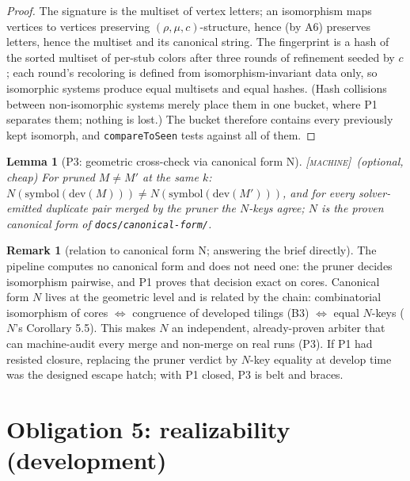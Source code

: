 \documentclass[11pt]{article}
\newtheorem{lemma}[theorem]{Lemma}
\theoremstyle{definition}
\newtheorem{remark}[theorem]{Remark}
\newcommand{\MACHINE}{\textnormal{\textsc{[machine]}}}
\newcommand{\dev}{\mathrm{dev}}
\begin{document}
\begin{proof}
The signature is the multiset of vertex letters; an isomorphism maps vertices to vertices
preserving $(\rho, \mu, c)$-structure, hence (by A6) preserves letters, hence the
multiset and its canonical string. The fingerprint is a hash of the sorted multiset of
per-stub colors after three rounds of refinement seeded by $c$; each round's recoloring
is defined from isomorphism-invariant data only, so isomorphic systems produce equal
multisets and equal hashes. (Hash collisions between non-isomorphic systems merely place
them in one bucket, where P1 separates them; nothing is lost.) The bucket therefore
contains every previously kept isomorph, and \texttt{compareToSeen} tests against all of
them.
\end{proof}

\begin{lemma}[P3: geometric cross-check via canonical form N]\label{lem:P3}
\MACHINE\ (optional, cheap)\;
For pruned $M \ne M'$ at the same $k$:
$N(\mathrm{symbol}(\dev(M))) \ne N(\mathrm{symbol}(\dev(M')))$, and for every
solver-emitted duplicate pair merged by the pruner the $N$-keys agree; $N$ is the proven
canonical form of \texttt{docs/canonical-form/}.
\end{lemma}

\begin{remark}[relation to canonical form N; answering the brief directly]
The pipeline computes no canonical form and does not need one: the pruner decides
isomorphism pairwise, and P1 proves that decision exact on cores. Canonical form $N$
lives at the geometric level and is related by the chain: combinatorial isomorphism of
cores $\iff$ congruence of developed tilings (B3) $\iff$ equal $N$-keys ($N$'s
Corollary 5.5). This makes $N$ an independent, already-proven arbiter that can
machine-audit every merge and non-merge on real runs (P3). If P1 had resisted closure,
replacing the pruner verdict by $N$-key equality at develop time was the designed escape
hatch; with P1 closed, P3 is belt and braces.
\end{remark}

\section{Obligation 5: realizability (development)}\label{sec:realizability}
\end{document}
